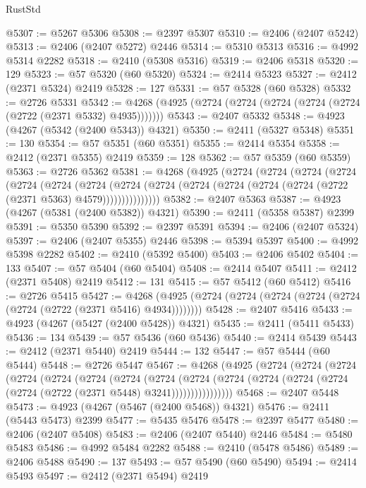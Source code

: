 \begin{lexlean}{RustStd}
\begin{coremodule}
@5307 := @5267 @5306
@5308 := @2397 @5307
@5310 := @2406 (@2407 @5242)
@5313 := @2406 (@2407 @5272) @2446
@5314 := @5310 @5313
@5316 := @4992 @5314 @2282
@5318 := @2410 (@5308 @5316)
@5319 := @2406 @5318
@5320 := 129
@5323 := @57 @5320 (@60 @5320)
@5324 := @2414 @5323
@5327 := @2412 (@2371 @5324) @2419
@5328 := 127
@5331 := @57 @5328 (@60 @5328)
@5332 := @2726 @5331
@5342 := @4268 (@4925 (@2724 (@2724 (@2724 (@2724 (@2724 (@2722 (@2371 @5332) @4935)))))))
@5343 := @2407 @5332
@5348 := @4923 (@4267 (@5342 (@2400 @5343)) @4321)
@5350 := @2411 (@5327 @5348)
@5351 := 130
@5354 := @57 @5351 (@60 @5351)
@5355 := @2414 @5354
@5358 := @2412 (@2371 @5355) @2419
@5359 := 128
@5362 := @57 @5359 (@60 @5359)
@5363 := @2726 @5362
@5381 := @4268
    (@4925
      (@2724
        (@2724
          (@2724
            (@2724
              (@2724
                (@2724
                  (@2724
                    (@2724
                      (@2724 (@2724 (@2724 (@2724 (@2724 (@2722 (@2371 @5363) @4579)))))))))))))))
@5382 := @2407 @5363
@5387 := @4923 (@4267 (@5381 (@2400 @5382)) @4321)
@5390 := @2411 (@5358 @5387) @2399
@5391 := @5350 @5390
@5392 := @2397 @5391
@5394 := @2406 (@2407 @5324)
@5397 := @2406 (@2407 @5355) @2446
@5398 := @5394 @5397
@5400 := @4992 @5398 @2282
@5402 := @2410 (@5392 @5400)
@5403 := @2406 @5402
@5404 := 133
@5407 := @57 @5404 (@60 @5404)
@5408 := @2414 @5407
@5411 := @2412 (@2371 @5408) @2419
@5412 := 131
@5415 := @57 @5412 (@60 @5412)
@5416 := @2726 @5415
@5427 := @4268 (@4925 (@2724 (@2724 (@2724 (@2724 (@2724 (@2724 (@2722 (@2371 @5416) @4934))))))))
@5428 := @2407 @5416
@5433 := @4923 (@4267 (@5427 (@2400 @5428)) @4321)
@5435 := @2411 (@5411 @5433)
@5436 := 134
@5439 := @57 @5436 (@60 @5436)
@5440 := @2414 @5439
@5443 := @2412 (@2371 @5440) @2419
@5444 := 132
@5447 := @57 @5444 (@60 @5444)
@5448 := @2726 @5447
@5467 := @4268
    (@4925
      (@2724
        (@2724
          (@2724
            (@2724
              (@2724
                (@2724
                  (@2724
                    (@2724
                      (@2724
                        (@2724
                          (@2724 (@2724 (@2724 (@2724 (@2722 (@2371 @5448) @3241))))))))))))))))
@5468 := @2407 @5448
@5473 := @4923 (@4267 (@5467 (@2400 @5468)) @4321)
@5476 := @2411 (@5443 @5473) @2399
@5477 := @5435 @5476
@5478 := @2397 @5477
@5480 := @2406 (@2407 @5408)
@5483 := @2406 (@2407 @5440) @2446
@5484 := @5480 @5483
@5486 := @4992 @5484 @2282
@5488 := @2410 (@5478 @5486)
@5489 := @2406 @5488
@5490 := 137
@5493 := @57 @5490 (@60 @5490)
@5494 := @2414 @5493
@5497 := @2412 (@2371 @5494) @2419

\end{coremodule}
\end{lexlean}
